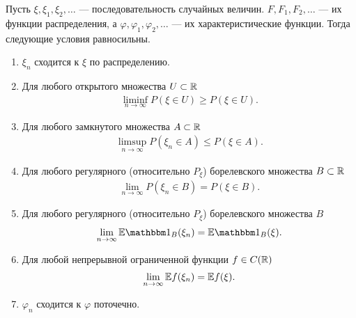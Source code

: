 \documentclass[../main.tex]{subfiles}
\begin{document}
\begin{thm}
 Пусть $ \xi, \xi_1, \xi_2, \ldots $ --- последовательность случайных величин. $ F, F_1, F_2, \ldots $ --- их функции распределения, а $ \varphi, \varphi_1, \varphi_2, \ldots $ --- их характеристические функции. Тогда следующие условия равносильны.
 \begin{enumerate}
  \item $ \xi_n $ сходится к $ \xi $ по распределению.
  \item Для любого открытого множества $ U \subset \mathbb{R} $
   \begin{align*}
    \liminf_{n \to \infty} P(\xi \in U) \geqslant P(\xi \in U).
   \end{align*}
  \item Для любого замкнутого множества $ A \subset \mathbb{R} $
   \begin{align*}
    \limsup_{n \to \infty} P(\xi_n \in A) \leqslant P(\xi \in A).
   \end{align*}
  \item Для любого регулярного (относительно $ P_\xi $) борелевского множества $ B \subset \mathbb{R}$
   \begin{align*}
    \lim_{n \to \infty} P(\xi_n \in B) = P(\xi \in B).
   \end{align*}
  \item Для любого регулярного (относительно $ P_\xi $) борелевского множества $ B $
   \begin{align*}
    \lim_{n \to \infty} \E \Ind_B(\xi_n) = \E \Ind_B(\xi).
   \end{align*}
  \item Для любой непрерывной ограниченной функции $ f \in C(\mathbb{R}) $
   \begin{align*}
    \lim_{n \to \infty} \mathbb E f(\xi_n) = \mathbb E f(\xi).
   \end{align*}
  \item $ \varphi_n $ сходится к $ \varphi $ поточечно.
 \end{enumerate}
\end{thm}
\end{document}
